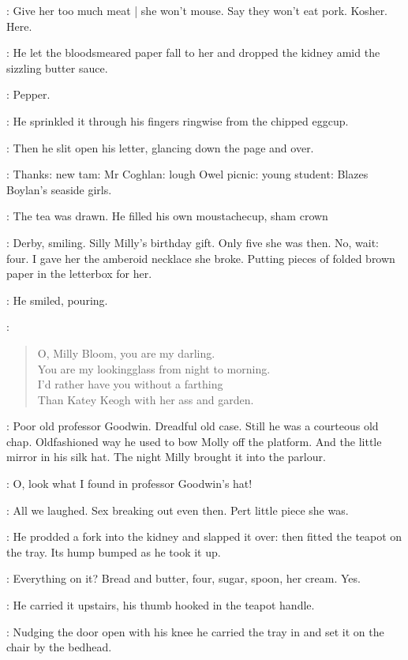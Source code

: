 \BloomInt:
Give her too much meat |
she won't mouse.
Say they won't eat pork.
Kosher.
Here.

:
He let the bloodsmeared paper fall to her
and dropped the kidney amid the sizzling butter sauce.

\BloomInt:
Pepper.

:
He sprinkled it through his fingers ringwise from the chipped eggcup.

:
Then he slit open his letter,
glancing down the page and over.

\Milly:
Thanks:
new tam:
Mr Coghlan:
lough Owel picnic:
young student:
Blazes Boylan's seaside girls.

:
The tea was drawn.
He filled his own moustachecup, sham crown

\BloomInt:
Derby, smiling.
Silly Milly's birthday gift.
Only five she was then.
No, wait: four.
I gave her the amberoid necklace she broke.
Putting pieces of folded brown paper in the letterbox for her.

:
He smiled, pouring.

\BloomInt:
\begin{quote}
    O, Milly Bloom, you are my darling. \\
    You are my lookingglass from night to morning. \\
    I'd rather have you without a farthing \\
    Than Katey Keogh with her ass and garden.
\end{quote}

\BloomInt:
Poor old professor Goodwin.
Dreadful old case.
Still he was a courteous old chap.
Oldfashioned way he used to bow Molly off the platform.
And the little mirror in his silk hat.
The night Milly brought it into the parlour.

\Milly:
O, look what I found in professor Goodwin's hat!

\BloomInt:
All we laughed.
Sex breaking out even then.
Pert little piece she was.

:
He prodded a fork into the kidney and slapped it over:
then fitted the teapot on the tray.
Its hump bumped as he took it up.

\BloomInt:
Everything on it?
Bread and butter,
four, sugar, spoon, her cream.
Yes.

:
He carried it upstairs,
his thumb hooked in the teapot handle.

:
Nudging the door open with his knee
he carried the tray in
and set it on the chair by the bedhead.

